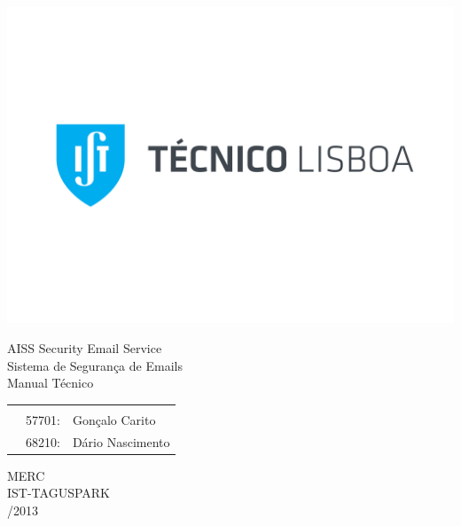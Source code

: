 \thispagestyle {empty}

\includegraphics[bb=5.8cm 11cm 0cm 0cm,scale=0.38]{./Figures/IST_Logo}

\begin{center}
%

\vspace{6.5cm}
{\FontLb AISS Security Email Service} \\
{\FontLn Sistema de Segurança de Emails} \\
\vspace{1.0cm}
{\FontLn Manual Técnico} \\
\vspace*{1.0cm}
\begin{center}
\begin{tabular}{r@{~}l l}
    \multicolumn{3}{c}{\bfseries\textbf{ }} \\
    & 57701: & Gonçalo Carito \\
    & 68210: & Dário Nascimento \\
\end{tabular}
\end{center}
\vspace*{2.5cm}
{\FontLb MERC} \\
{\FontLb IST-TAGUSPARK} \\

\vspace{1.5cm}
{/2013} \\
%
\end{center}

\cleardoublepage

